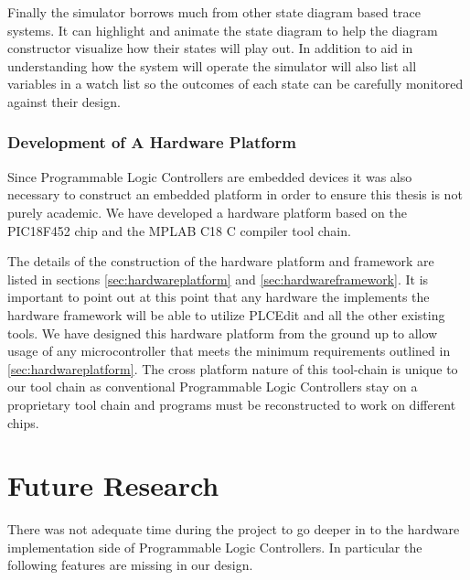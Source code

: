 Finally the simulator borrows much from other state diagram based trace systems. It can highlight and animate the state diagram to help the diagram constructor visualize how their states will play out. In addition to aid in understanding how the system will operate the simulator will also list all variables in a watch list so the outcomes of each state can be carefully monitored against their design.

\subsubsection{Development of A Hardware Platform}
Since Programmable Logic Controllers are embedded devices it was also necessary to construct an embedded platform in order to ensure this thesis is not purely academic. We have developed a hardware platform based on the PIC18F452 chip and the MPLAB C18 C compiler tool chain.

The details of the construction of the hardware platform and framework are listed in sections \ref{sec:hardwareplatform} and \ref{sec:hardwareframework}. It is important to point out at this point that any hardware the implements the hardware framework will be able to utilize PLCEdit and all the other existing tools. We have designed this hardware platform from the ground up to allow usage of any microcontroller that meets the minimum requirements outlined in \ref{sec:hardwareplatform}. The cross platform nature of this tool-chain is unique to our tool chain as conventional Programmable Logic Controllers stay on a proprietary tool chain and programs must be reconstructed to work on different chips.


\section{Future Research}
There was not adequate time during the project to go deeper in to the hardware implementation side of Programmable Logic Controllers. In particular the following features are missing in our design.

